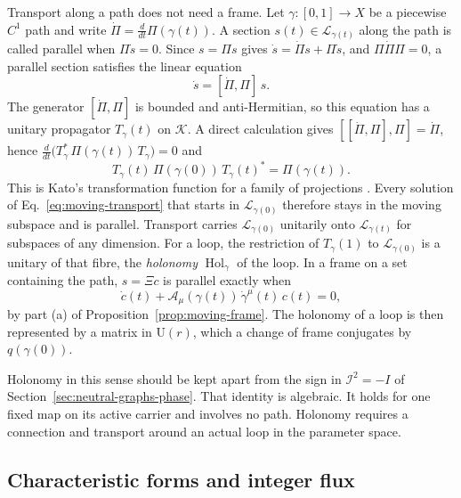 \documentclass[11pt]{article}
\theoremstyle{definition}
\begin{document}
Transport along a path does not need a frame. Let $\gamma:[0,1]\to X$ be a piecewise $C^1$ path and write $\dot\Pi=\frac{d}{dt}\Pi(\gamma(t))$. A section $s(t)\in\mathcal L_{\gamma(t)}$ along the path is called parallel when $\Pi\dot s=0$. Since $s=\Pi s$ gives $\dot s=\dot\Pi s+\Pi\dot s$, and $\Pi\dot\Pi\Pi=0$, a parallel section satisfies the linear equation
\begin{equation}
 \dot s=[\dot\Pi,\Pi]\,s .
 \label{eq:moving-transport}
\end{equation}
The generator $[\dot\Pi,\Pi]$ is bounded and anti-Hermitian, so this equation has a unitary propagator $T_\gamma(t)$ on $\mathcal K$. A direct calculation gives $[[\dot\Pi,\Pi],\Pi]=\dot\Pi$, hence $\frac{d}{dt}\bigl(T_\gamma^*\,\Pi(\gamma(t))\,T_\gamma\bigr)=0$ and
\begin{equation}
 T_\gamma(t)\,\Pi(\gamma(0))\,T_\gamma(t)^*=\Pi(\gamma(t)).
 \label{eq:moving-transport-intertwining}
\end{equation}
This is Kato's transformation function for a family of projections \cite{Kato}. Every solution of Eq.~\eqref{eq:moving-transport} that starts in $\mathcal L_{\gamma(0)}$ therefore stays in the moving subspace and is parallel. Transport carries $\mathcal L_{\gamma(0)}$ unitarily onto $\mathcal L_{\gamma(t)}$ for subspaces of any dimension. For a loop, the restriction of $T_\gamma(1)$ to $\mathcal L_{\gamma(0)}$ is a unitary of that fibre, the \emph{holonomy} $\operatorname{Hol}_\gamma$ of the loop. In a frame on a set containing the path, $s=\Xi c$ is parallel exactly when
\begin{equation}
 \dot c(t)+\mathcal A_\mu(\gamma(t))\,\dot\gamma^\mu(t)\,c(t)=0 ,
 \label{eq:moving-frame-transport}
\end{equation}
by part (a) of Proposition~\ref{prop:moving-frame}. The holonomy of a loop is then represented by a matrix in $\mathrm U(r)$, which a change of frame conjugates by $q(\gamma(0))$.

Holonomy in this sense should be kept apart from the sign in $\mathcal I^2=-I$ of Section~\ref{sec:neutral-graphs-phase}. That identity is algebraic. It holds for one fixed map on its active carrier and involves no path. Holonomy requires a connection and transport around an actual loop in the parameter space.

\subsection{Characteristic forms and integer flux}
\label{subsec:moving-characteristic}
\end{document}
